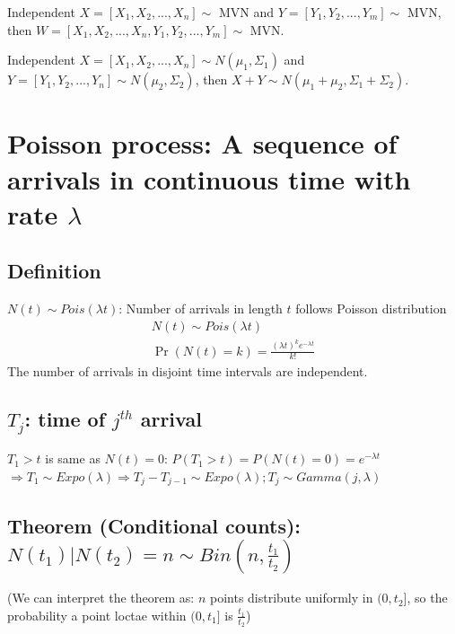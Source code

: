 \documentclass[11pt]{elegantbook}
\begin{document}
\begin{theorem}
    Independent $X=[X_1,X_2,...,X_n]\sim$ MVN and $Y=[Y_1,Y_2,...,Y_m]\sim$ MVN, then $W=[X_1,X_2,...,X_n,Y_1,Y_2,...,Y_m]\sim$ MVN.
\end{theorem}

\begin{theorem}
    Independent $X=[X_1,X_2,...,X_n]\sim N(\mu_1,\Sigma_1)$ and $Y=[Y_1,Y_2,...,Y_n]\sim N(\mu_2,\Sigma_2)$, then $X+Y\sim N(\mu_1+\mu_2,\Sigma_1+\Sigma_2)$.
\end{theorem}














\section{Poisson process: A sequence of arrivals in continuous time with rate $\lambda$}
\subsection{Definition}
$N(t)\sim Pois(\lambda t)$: Number of arrivals in length $t$ follows Poisson distribution
\begin{equation}
    \begin{aligned}
        N(t)\sim Pois(\lambda t)\\
        \Pr(N(t)=k)=\frac{(\lambda t)^k e^{-\lambda t}}{k!}
    \end{aligned}
    \nonumber
\end{equation}
The number of arrivals in disjoint time intervals are independent.
\subsection{$T_j$: time of $j^{th}$ arrival}
$T_1>t$ is same as $N(t)=0$: $P(T_1>t)=P(N(t)=0)=e^{-\lambda t}$\\
$\Rightarrow T_1\sim Expo(\lambda) \Rightarrow T_j-T_{j-1}\sim Expo(\lambda); T_j\sim Gamma(j,\lambda)$

\subsection{Theorem (Conditional counts): $N(t_1)|N(t_2)=n\sim Bin(n,\frac{t_1}{t_2})$}
(We can interpret the theorem as: $n$ points distribute uniformly in $(0,t_2]$, so the probability a point loctae within $(0,t_1]$ is $\frac{t_1}{t_2}$)
\end{document}
